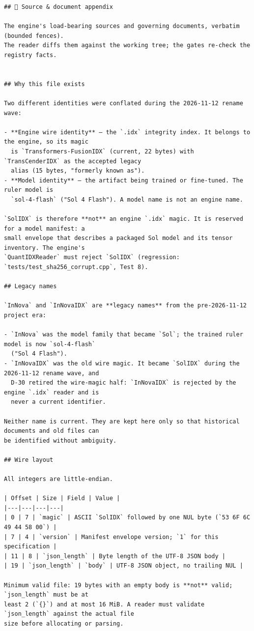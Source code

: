 \begin{Verbatim}[breaklines,breakanywhere,fontsize=\footnotesize]
## 📜 Source & document appendix

The engine's load-bearing sources and governing documents, verbatim (bounded fences).
The reader diffs them against the working tree; the gates re-check the registry facts.


## Why this file exists

Two different identities were conflated during the 2026-11-12 rename wave:

- **Engine wire identity** — the `.idx` integrity index. It belongs to the engine, so its magic
  is `Transformers-FusionIDX` (current, 22 bytes) with `TransCenderIDX` as the accepted legacy
  alias (15 bytes, "formerly known as").
- **Model identity** — the artifact being trained or fine-tuned. The ruler model is
  `sol-4-flash` ("Sol 4 Flash"). A model name is not an engine name.

`SolIDX` is therefore **not** an engine `.idx` magic. It is reserved for a model manifest: a
small envelope that describes a packaged Sol model and its tensor inventory. The engine's
`QuantIDXReader` must reject `SolIDX` (regression: `tests/test_sha256_corrupt.cpp`, Test 8).

## Legacy names

`InNova` and `InNovaIDX` are **legacy names** from the pre-2026-11-12 project era:

- `InNova` was the model family that became `Sol`; the trained ruler model is now `sol-4-flash`
  ("Sol 4 Flash").
- `InNovaIDX` was the old wire magic. It became `SolIDX` during the 2026-11-12 rename wave, and
  D-30 retired the wire-magic half: `InNovaIDX` is rejected by the engine `.idx` reader and is
  never a current identifier.

Neither name is current. They are kept here only so that historical documents and old files can
be identified without ambiguity.

## Wire layout

All integers are little-endian.

| Offset | Size | Field | Value |
|---|---|---|---|
| 0 | 7 | `magic` | ASCII `SolIDX` followed by one NUL byte (`53 6F 6C 49 44 58 00`) |
| 7 | 4 | `version` | Manifest envelope version; `1` for this specification |
| 11 | 8 | `json_length` | Byte length of the UTF-8 JSON body |
| 19 | `json_length` | `body` | UTF-8 JSON object, no trailing NUL |

Minimum valid file: 19 bytes with an empty body is **not** valid; `json_length` must be at
least 2 (`{}`) and at most 16 MiB. A reader must validate `json_length` against the actual file
size before allocating or parsing.


\end{Verbatim}
